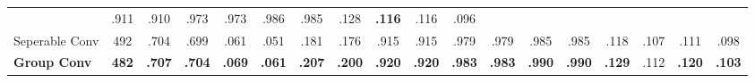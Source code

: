 \begin{table}[htbp]
{\begin{tabular}{@{} p{1.2cm} p{0.5cm} p{0.55cm} p{0.55cm} p{0.55cm} p{0.55cm} p{0.55cm} p{0.55cm} p{0.55cm} p{0.55cm} p{0.55cm} p{0.55cm} p{0.55cm} p{0.55cm} p{0.52cm} p{0.52cm} p{0.52cm} p{0.52cm} @{}}
  & \multicolumn{1}{c}{.911}
  & \multicolumn{1}{c}{.910}
  & \multicolumn{1}{c}{.973}
  & \multicolumn{1}{c}{.973}
  & \multicolumn{1}{c}{.986}
  & \multicolumn{1}{c}{.985}
  & \multicolumn{1}{c}{.128}
  & \multicolumn{1}{c}{{\textbf{.116}}}
  & \multicolumn{1}{c}{.116}
  & \multicolumn{1}{c}{.096} \\ 
\multirow{1}{*}{Seperable Conv} 
  & \multicolumn{1}{c}{492} 
  & \multicolumn{1}{c}{.704}
  & \multicolumn{1}{c}{.699}
  & \multicolumn{1}{c}{.061}
  & \multicolumn{1}{c}{.051}
  & \multicolumn{1}{c}{.181}
  & \multicolumn{1}{c}{.176}
  & \multicolumn{1}{c}{.915}
  & \multicolumn{1}{c}{.915}
  & \multicolumn{1}{c}{.979}
  & \multicolumn{1}{c}{.979}
  & \multicolumn{1}{c}{.985}
  & \multicolumn{1}{c}{.985}
  & \multicolumn{1}{c}{.118}
  & \multicolumn{1}{c}{.107}
  & \multicolumn{1}{c}{.111}
  & \multicolumn{1}{c}{.098} \\ 
\multirow{1}{*}{\textbf{Group Conv}}
  & \multicolumn{1}{c}{\textbf{482}} 
  & \multicolumn{1}{c}{{\textbf{.707}}}
  & \multicolumn{1}{c}{{\textbf{.704}}}
  & \multicolumn{1}{c}{{\textbf{.069}}}
  & \multicolumn{1}{c}{{\textbf{.061}}}
  & \multicolumn{1}{c}{{\textbf{.207}}}
  & \multicolumn{1}{c}{{\textbf{.200}}}
  & \multicolumn{1}{c}{{\textbf{.920}}}
  & \multicolumn{1}{c}{{\textbf{.920}}}
  & \multicolumn{1}{c}{{\textbf{.983}}}
  & \multicolumn{1}{c}{{\textbf{.983}}}
  & \multicolumn{1}{c}{{\textbf{.990}}}
  & \multicolumn{1}{c}{{\textbf{.990}}}
  & \multicolumn{1}{c}{{\textbf{.129}}}
  & \multicolumn{1}{c}{.112}
  & \multicolumn{1}{c}{{\textbf{.120}}}
  & \multicolumn{1}{c}{{\textbf{.103}}} \\ 
\bottomrule
\end{tabular}}
\end{table}
